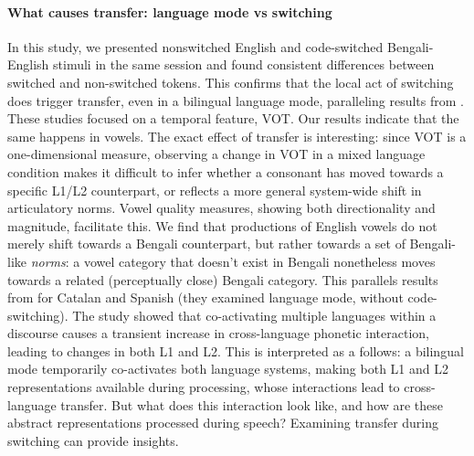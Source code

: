 \documentclass[12 pt]{article}
\begin{document}
\paragraph{\textbf{What causes transfer: language mode vs switching}}
In this study, we presented nonswitched English and code-switched Bengali-English stimuli in the same session and found consistent differences between switched and non-switched tokens. This confirms that the local act of switching does trigger transfer, even in a bilingual language mode, paralleling results from \cite{olson2016role, tsui2019impact, piccinini2015voice}. These studies focused on a temporal feature, VOT. Our results indicate that the same happens in vowels. The exact effect of transfer is interesting: since VOT is a one-dimensional measure, observing a change in VOT in a mixed language condition makes it difficult to infer whether a consonant has moved towards a specific L1/L2 counterpart, or reflects a more general system-wide shift in articulatory norms. Vowel quality measures, showing both directionality and magnitude, facilitate this. We find that productions of English vowels do not merely shift towards a Bengali counterpart, but rather towards a set of Bengali-like \textit{norms}: a vowel category that doesn't exist in Bengali nonetheless moves towards a related (perceptually close) Bengali category. This parallels results from \cite{simonet2014phonetic} for Catalan and Spanish (they examined language mode, without code-switching). The study showed that co-activating multiple languages within a discourse causes a transient increase in cross-language phonetic interaction, leading to changes in both L1 and L2. This is interpreted as a follows: a bilingual mode temporarily co-activates both language systems, making both L1 and L2 representations available during processing, whose interactions lead to cross-language transfer. But what does this interaction look like, and how are these abstract representations processed during speech? Examining transfer during switching can provide insights.
\end{document}

